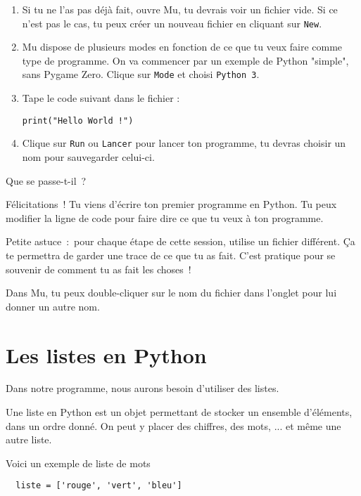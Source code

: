 \documentclass[11pt]{article}
\begin{document}
\begin{enumerate}
    \item Si tu ne l'as pas déjà fait, ouvre Mu, tu devrais voir un fichier vide. Si ce n'est pas le cas, tu peux créer un nouveau fichier en cliquant sur \texttt{New}.
    
    \item Mu dispose de plusieurs modes en fonction de ce que tu veux faire comme type de programme. On va commencer par un exemple de Python "simple", sans Pygame Zero. Clique sur \texttt{Mode} et choisi \texttt{Python 3}.

    \item Tape le code suivant dans le fichier :
\begin{lstlisting}
print("Hello World !")
\end{lstlisting}

    \item Clique sur \texttt{Run} ou \texttt{Lancer} pour lancer ton programme, tu devras choisir un nom pour sauvegarder celui-ci.
\end{enumerate}

Que se passe-t-il~?

Félicitations~! Tu viens d'écrire ton premier programme en Python.
Tu peux modifier la ligne de code pour faire dire ce que tu veux à ton programme.

\begin{framed}
Petite astuce~:~pour chaque étape de cette session, utilise un fichier différent.
Ça te permettra de garder une trace de ce que tu as fait.
C'est pratique pour se souvenir de comment tu as fait les choses~!

Dans Mu, tu peux double-cliquer sur le nom du fichier dans l'onglet pour lui donner un autre nom.
\end{framed}

\section{Les listes en Python}

Dans notre programme, nous aurons besoin d'utiliser des listes.

Une liste en Python est un objet permettant de stocker un ensemble d'éléments, dans un ordre donné. On peut y placer des chiffres, des mots, ... et même une autre liste.

Voici un exemple de liste de mots
\begin{lstlisting}
  liste = ['rouge', 'vert', 'bleu']
\end{lstlisting}
\end{document}

